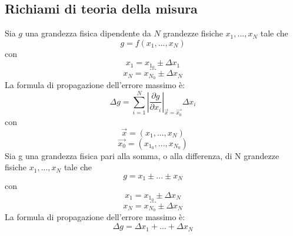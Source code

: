 \subsection{Richiami di teoria della misura}
Sia $g$ una grandezza fisica dipendente da $N$ grandezze fisiche $x_1,...,x_N$ tale che
\begin{equation}
	g=f(x_1,...,x_N)
\end{equation}
con
\begin{equation}
	x_1 = x_{1_0}\pm \Delta x_1
\end{equation}
$$ ... $$
\begin{equation}
	x_N = x_{N_0}\pm \Delta x_N
\end{equation}
La formula di propagazione dell'errore massimo è:
\begin{equation}
	\Delta g=\displaystyle\sum_{i=1}^{N}\left|\frac{\partial g}{\partial x_i}\right|_{\vec{x}=\vec{x_0}}\Delta x_i
\end{equation}
con
\begin{equation}
	\vec{x}=(x_1,...,x_N)
\end{equation}
\begin{equation}
	\vec{x_0}=(x_{1_0},...,x_{N_0})
\end{equation}
Sia g una grandezza fisica pari alla somma, o alla differenza, di N grandezze fisiche $x_1,...,x_N$ tale che
\begin{equation}
	g=x_1\pm...\pm x_N
\end{equation}
con
\begin{equation}
	x_1=x_{1_0}\pm \Delta x_N
\end{equation}
$$ ... $$
\begin{equation}
	x_N=x_{N_0}\pm \Delta x_N
\end{equation}
La formula di propagazione dell'errore massimo è:
\begin{equation}
	\Delta g= \Delta x_1+...+\Delta x_N
\end{equation}


